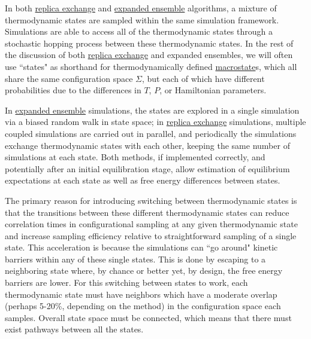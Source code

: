 \documentclass[9pt,review]{livecoms}
\begin{document}
In both \hyperlink{ref:ReplEx} {replica exchange} and \hyperlink{ref:ExpEns} {expanded ensemble} algorithms, a mixture of thermodynamic states are sampled within the same simulation framework. Simulations are able to access all of the  thermodynamic states through a stochastic hopping process between these thermodynamic states.  In the rest of the discussion of both \hyperlink{ref:ReplEx} {replica exchange} and expanded ensembles, we will often use ``states" as shorthand for thermodynamically defined \hyperlink{ref:Macrostate} {macrostate}s, which all share the same configuration space $\Sigma$, but each of which have different probabilities due to the differences in $T$, $P$, or Hamiltonian parameters.

In \hyperlink{ref:ExpEns} {expanded ensemble} simulations, the states are explored in a single simulation via a biased random walk in state space; in \hyperlink{ref:ReplEx} {replica exchange} simulations, multiple coupled simulations are carried out in parallel, and periodically the simulations exchange thermodynamic states with each other, keeping the same number of simulations at each state. Both methods, if implemented correctly, and potentially after an initial equilibration stage, allow estimation of equilibrium expectations at each state as well as free energy differences between states.

The primary reason for introducing switching between thermodynamic states is that the transitions between these different thermodynamic states can reduce correlation times in configurational sampling at any given thermodynamic state and increase sampling efficiency relative to straightforward sampling of a single state. This acceleration is because the simulations can ``go around"  kinetic barriers within any of these single states. This is done by escaping to a neighboring state where, by chance or better yet, by design, the free energy barriers are lower.  For this switching between states to work, each thermodynamic state must have neighbors which have a moderate overlap (perhaps 5-20\%, depending on the method) in the configuration space each samples. Overall state space must be connected, which means that there must exist pathways between all the states. 
\end{document}
